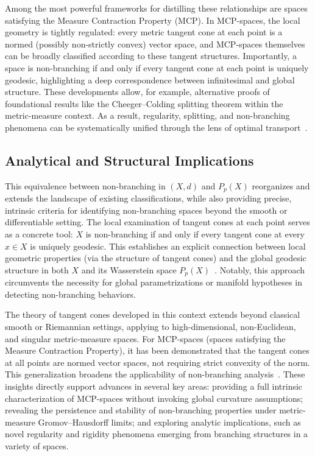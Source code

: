 \documentclass[sigconf]{acmart}
\begin{document}
Among the most powerful frameworks for distilling these relationships are spaces satisfying the Measure Contraction Property (MCP). In MCP-spaces, the local geometry is tightly regulated: every metric tangent cone at each point is a normed (possibly non-strictly convex) vector space, and MCP-spaces themselves can be broadly classified according to these tangent structures. Importantly, a space is non-branching if and only if every tangent cone at each point is uniquely geodesic, highlighting a deep correspondence between infinitesimal and global structure. These developments allow, for example, alternative proofs of foundational results like the Cheeger–Colding splitting theorem within the metric-measure context. As a result, regularity, splitting, and non-branching phenomena can be systematically unified through the lens of optimal transport~\cite{ref107}.

\subsection{Analytical and Structural Implications}

This equivalence between non-branching in $(X, d)$ and $P_p(X)$ reorganizes and extends the landscape of existing classifications, while also providing precise, intrinsic criteria for identifying non-branching spaces beyond the smooth or differentiable setting. The local examination of tangent cones at each point serves as a concrete tool: $X$ is non-branching if and only if every tangent cone at every $x \in X$ is uniquely geodesic. This establishes an explicit connection between local geometric properties (via the structure of tangent cones) and the global geodesic structure in both $X$ and its Wasserstein space $P_p(X)$~\cite{ref107}. Notably, this approach circumvents the necessity for global parametrizations or manifold hypotheses in detecting non-branching behaviors.

The theory of tangent cones developed in this context extends beyond classical smooth or Riemannian settings, applying to high-dimensional, non-Euclidean, and singular metric-measure spaces. For MCP-spaces (spaces satisfying the Measure Contraction Property), it has been demonstrated that the tangent cones at all points are normed vector spaces, not requiring strict convexity of the norm. This generalization broadens the applicability of non-branching analysis~\cite{ref107}. These insights directly support advances in several key areas: providing a full intrinsic characterization of MCP-spaces without invoking global curvature assumptions; revealing the persistence and stability of non-branching properties under metric-measure Gromov--Hausdorff limits; and exploring analytic implications, such as novel regularity and rigidity phenomena emerging from branching structures in a variety of spaces.
\end{document}
